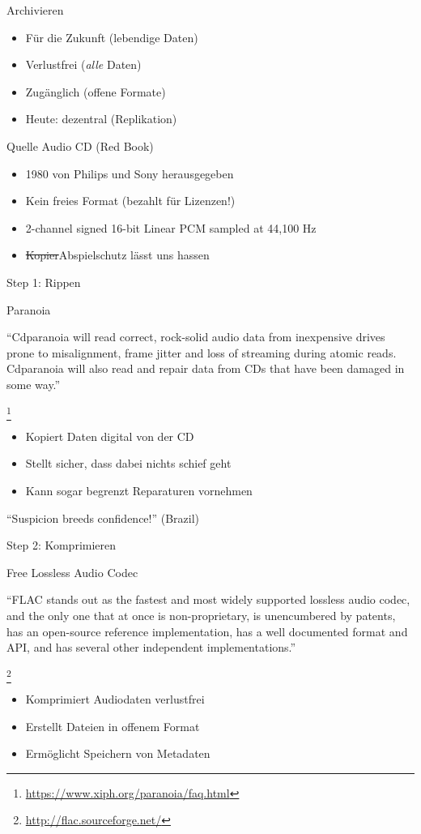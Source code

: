 \documentclass[aspectratio=1610]{beamer}
\newcommand{\src}[1]{
  \raggedright{
    \footnote{
      \small{\url{#1}}
    }
  }
}
\newcommand{\concept}[2]{
  \begin{block}{#1}
    \pause
    #2
  \end{block}
}
\begin{document}
  \begin{frame}{Archivieren}
    \begin{itemize}
      \item Für die Zukunft (lebendige Daten)
      \item Verlustfrei (\textsl{alle} Daten)
      \item Zugänglich (offene Formate)
      \item Heute: dezentral (Replikation)
    \end{itemize}
  \end{frame}

  \begin{frame}{Quelle}
    Audio CD (Red Book)
    \begin{itemize}
      \item 1980 von Philips und Sony herausgegeben
      \item Kein freies Format (bezahlt für Lizenzen!)
      \item 2-channel signed 16-bit Linear PCM sampled at 44,100 Hz
      \item \sout{Kopier}Abspielschutz lässt uns hassen
    \end{itemize}
  \end{frame}

  \begin{frame}{Step 1: Rippen}
    \concept{Paranoia}{
      “Cdparanoia will read correct, rock-solid audio data
      from inexpensive drives prone to misalignment, frame jitter and loss of
      streaming during atomic reads. Cdparanoia will also read and repair data
      from CDs that have been damaged in some
      way.”\src{https://www.xiph.org/paranoia/faq.html}
    }
    \begin{itemize}
      \pause
      \item Kopiert Daten digital von der CD
      \pause
      \item Stellt sicher, dass dabei nichts schief geht
      \pause
      \item Kann sogar begrenzt Reparaturen vornehmen
    \end{itemize}
    \pause
    “Suspicion breeds confidence!” (Brazil)
  \end{frame}


  \begin{frame}{Step 2: Komprimieren}
    \concept{Free Lossless Audio Codec}{
      “FLAC stands out as the fastest and most widely supported lossless audio
      codec, and the only one that at once is non-proprietary, is unencumbered
      by patents, has an open-source reference implementation, has a well
      documented format and API, and has several other independent
      implementations.”\src{http://flac.sourceforge.net/}
    }
    \begin{itemize}
      \pause
      \item Komprimiert Audiodaten verlustfrei
      \pause
      \item Erstellt Dateien in offenem Format
      \pause
      \item Ermöglicht Speichern von Metadaten
    \end{itemize}
  \end{frame}
\end{document}
